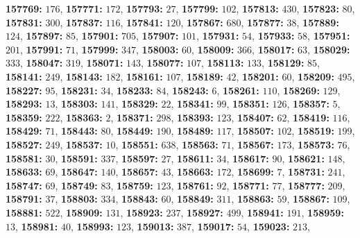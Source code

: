 \textsf{\bfseries 157769:} $176$, \textsf{\bfseries 157771:} $172$, \textsf{\bfseries 157793:} $27$, \textsf{\bfseries 157799:} $102$, \textsf{\bfseries 157813:} $430$, \textsf{\bfseries 157823:} $80$, \textsf{\bfseries 157831:} $300$, \textsf{\bfseries 157837:} $116$, \textsf{\bfseries 157841:} $120$, \textsf{\bfseries 157867:} $680$, \textsf{\bfseries 157877:} $38$, \textsf{\bfseries 157889:} $124$, \textsf{\bfseries 157897:} $85$, \textsf{\bfseries 157901:} $705$, \textsf{\bfseries 157907:} $101$, \textsf{\bfseries 157931:} $54$, \textsf{\bfseries 157933:} $58$, \textsf{\bfseries 157951:} $201$, \textsf{\bfseries 157991:} $71$, \textsf{\bfseries 157999:} $347$, \textsf{\bfseries 158003:} $60$, \textsf{\bfseries 158009:} $366$, \textsf{\bfseries 158017:} $63$, \textsf{\bfseries 158029:} $333$, \textsf{\bfseries 158047:} $319$, \textsf{\bfseries 158071:} $143$, \textsf{\bfseries 158077:} $107$, \textsf{\bfseries 158113:} $133$, \textsf{\bfseries 158129:} $85$, \textsf{\bfseries 158141:} $249$, \textsf{\bfseries 158143:} $182$, \textsf{\bfseries 158161:} $107$, \textsf{\bfseries 158189:} $42$, \textsf{\bfseries 158201:} $60$, \textsf{\bfseries 158209:} $495$, \textsf{\bfseries 158227:} $95$, \textsf{\bfseries 158231:} $34$, \textsf{\bfseries 158233:} $84$, \textsf{\bfseries 158243:} $6$, \textsf{\bfseries 158261:} $110$, \textsf{\bfseries 158269:} $129$, \textsf{\bfseries 158293:} $13$, \textsf{\bfseries 158303:} $141$, \textsf{\bfseries 158329:} $22$, \textsf{\bfseries 158341:} $99$, \textsf{\bfseries 158351:} $126$, \textsf{\bfseries 158357:} $5$, \textsf{\bfseries 158359:} $222$, \textsf{\bfseries 158363:} $2$, \textsf{\bfseries 158371:} $298$, \textsf{\bfseries 158393:} $123$, \textsf{\bfseries 158407:} $62$, \textsf{\bfseries 158419:} $116$, \textsf{\bfseries 158429:} $71$, \textsf{\bfseries 158443:} $80$, \textsf{\bfseries 158449:} $190$, \textsf{\bfseries 158489:} $117$, \textsf{\bfseries 158507:} $102$, \textsf{\bfseries 158519:} $199$, \textsf{\bfseries 158527:} $249$, \textsf{\bfseries 158537:} $10$, \textsf{\bfseries 158551:} $638$, \textsf{\bfseries 158563:} $71$, \textsf{\bfseries 158567:} $173$, \textsf{\bfseries 158573:} $76$, \textsf{\bfseries 158581:} $30$, \textsf{\bfseries 158591:} $337$, \textsf{\bfseries 158597:} $27$, \textsf{\bfseries 158611:} $34$, \textsf{\bfseries 158617:} $90$, \textsf{\bfseries 158621:} $148$, \textsf{\bfseries 158633:} $69$, \textsf{\bfseries 158647:} $140$, \textsf{\bfseries 158657:} $43$, \textsf{\bfseries 158663:} $172$, \textsf{\bfseries 158699:} $7$, \textsf{\bfseries 158731:} $241$, \textsf{\bfseries 158747:} $69$, \textsf{\bfseries 158749:} $83$, \textsf{\bfseries 158759:} $123$, \textsf{\bfseries 158761:} $92$, \textsf{\bfseries 158771:} $77$, \textsf{\bfseries 158777:} $209$, \textsf{\bfseries 158791:} $37$, \textsf{\bfseries 158803:} $334$, \textsf{\bfseries 158843:} $60$, \textsf{\bfseries 158849:} $311$, \textsf{\bfseries 158863:} $59$, \textsf{\bfseries 158867:} $109$, \textsf{\bfseries 158881:} $522$, \textsf{\bfseries 158909:} $131$, \textsf{\bfseries 158923:} $237$, \textsf{\bfseries 158927:} $499$, \textsf{\bfseries 158941:} $191$, \textsf{\bfseries 158959:} $13$, \textsf{\bfseries 158981:} $40$, \textsf{\bfseries 158993:} $123$, \textsf{\bfseries 159013:} $387$, \textsf{\bfseries 159017:} $54$, \textsf{\bfseries 159023:} $213$, 

